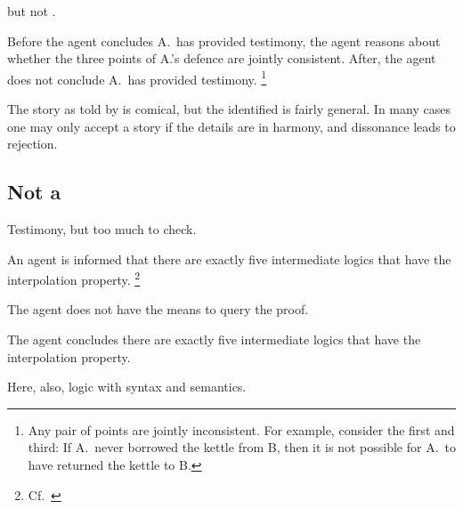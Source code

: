 \begin{note}
  \requ{} but not \fc{}.

  Before the agent concludes A.\ has provided testimony, the agent reasons about whether the three points of A.'s defence are jointly consistent.
  After, the agent does not conclude A.\ has provided testimony.%
  \footnote{
    Any pair of points are jointly inconsistent.
    For example, consider the first and third:
    If A.\ never borrowed the kettle from B, then it is not possible for A.\ to have returned the kettle to B.
  }

  The story as told by \citeauthor{Freud:1960wx} is comical, but the  identified is fairly general.
  In many cases one may only accept a story if the details are in harmony, and dissonance leads to rejection.
\end{note}

\subsection{Not a \requ{}}
\label{sec:not-requ}

\begin{note}
  Testimony, but too much to check.

  \begin{illustration}
    \label{illu:testimony-layperson}
    An agent is informed that there are exactly five intermediate logics that have the interpolation property.\nolinebreak
    \footnote{Cf.\ \textcite{Maksimova:1977un}}

    The agent does not have the means to query the proof.

    The agent concludes there are exactly five intermediate logics that have the interpolation property.
  \end{illustration}

  Here, also, logic with syntax and semantics.
\end{note}

